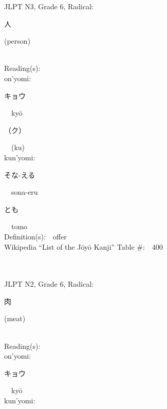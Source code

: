 \begin{multicols}{2}
{JLPT N3, Grade 6, Radical:\ \ {\begin{CJK}{UTF8}{min} 人 \end{CJK}} (person) } \\
Reading(s):\ \ \\
{\hspace*{1em}}on'yomi:\ \ \\
{\hspace*{2em}}{\begin{CJK}{UTF8}{min} キョウ \end{CJK}}\ \ ky\=o\ \ \\
{\hspace*{2em}}{\begin{CJK}{UTF8}{min} （ク） \end{CJK}}\ \ (ku)\ \ \\
{\hspace*{1em}}kun'yomi:\ \ \\
{\hspace*{2em}}{\begin{CJK}{UTF8}{min} そな-える \end{CJK}}\ \ sona-eru\ \ \\
{\hspace*{2em}}{\begin{CJK}{UTF8}{min} とも \end{CJK}}\ \ tomo\ \ \\
Definition(s):\ \ offer \\
Wikipedia ``List of the J\=oy\=o Kanji'' Table \#:\ \ 400 \\
\ \ \\
{\fontsize{34pt}{40pt}  }\ \ \\  %
{JLPT N2, Grade 6, Radical:\ \ {\begin{CJK}{UTF8}{min} 肉 \end{CJK}} (meat) } \\
Reading(s):\ \ \\
{\hspace*{1em}}on'yomi:\ \ \\
{\hspace*{2em}}{\begin{CJK}{UTF8}{min} キョウ \end{CJK}}\ \ ky\=o\ \ \\
{\hspace*{1em}}kun'yomi:\ \ \\

\end{multicols}
